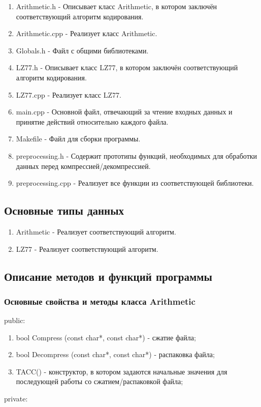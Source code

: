 \documentclass[12pt]{article}
\begin{document}
\begin{enumerate}
	\item Arithmetic.h - Описывает класс Arithmetic, в котором заключён соответствующий алгоритм кодирования. 
	\item Arithmetic.cpp - Реализует класс Arithmetic.
	\item Globals.h - Файл с общими библиотеками.
	\item LZ77.h - Описывает класс LZ77, в котором заключён соответствующий алгоритм кодирования.
	\item LZ77.cpp - Реализует класс LZ77.
	\item main.cpp - Основной файл, отвечающий за чтение входных данных и принятие действий относительно каждого файла.
	\item Makefile - Файл для сборки программы.
	\item preprocessing.h - Содержит прототипы функций, необходимых для обработки данных перед компрессией/декомпрессией.
	\item preprocessing.cpp - Реализует все функции из соответствующей библиотеки.
\end{enumerate}

\subsection*{Основные типы данных}

\begin{enumerate}
	\item Arithmetic - Реализует соответствующий алгоритм.
	\item LZ77 - Реализует соответствующий алгоритм.
\end{enumerate}

\subsection*{Описание методов и функций программы}
 
\subsubsection*{Основные свойства и методы класса Arithmetic}
\noindent
public:

\begin{enumerate}
	\item bool Compress (const char*, const char*) - сжатие файла;
	\item bool Decompress (const char*, const char*) - распаковка файла;
	\item TACC() - конструктор, в котором задаются начальные значения для последующей работы со сжатием/распаковкой файла;
\end{enumerate}
\noindent
private:
\end{document}
